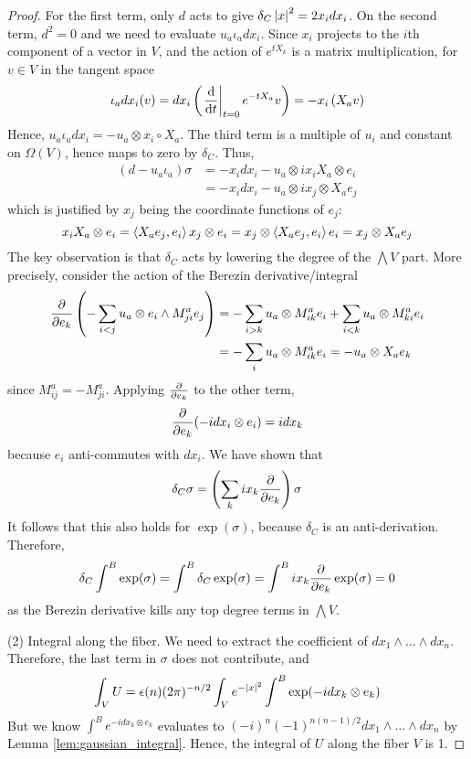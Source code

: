 \begin{proof}
For the first term, only $d$ acts to give $\delta_C \abs{x}^2 = 2x_i dx_i$.
On the second term, $d^2=0$ and we need to evaluate $u_a\iota_a dx_i$. 
Since $x_i$ projects to the $i$th component of a vector in $V$, and the action
of $e^{tX_k}$ is a matrix multiplication, for $v\in V$ in the tangent space
\begin{align} \label{eq:interior_dx}
	\iota_a dx_i(v)
	= d x_i \paren{\odv{}{t}_{t=0} e^{-tX_a} v} 
	= -x_i \paren{X_a v} 
\end{align}
Hence, $u_a\iota_a dx_i = -u_a\otimes x_i \circ X_a$. The third term is a
multiple of $u_i$ and constant on $\Omega(V)$,
hence maps to zero by  $\delta_C$. Thus, 
\begin{align}
	(d-u_a\iota_a) \sigma 
&= -x_i dx_i - u_a \otimes i x_iX_a \otimes e_i \nonumber \\
&= -x_i dx_i - u_a \otimes i x_j \otimes X_a e_j 
\end{align}
which is justified by $x_j$ being the coordinate functions of $e_j$:
\begin{equation} \label{eq:move_operator_tensor}
x_i X_a \otimes e_i 
= \gen{X_ae_j,e_i}x_j \otimes e_i 
= x_j \otimes \gen{X_ae_j,e_i}e_i 
= x_j \otimes X_a e_j 
\end{equation}
The key observation is that $\delta_C$ acts by lowering the degree of the
$\bigwedge V$ part. More precisely, consider the action of the Berezin
derivative/integral
\begin{align*}
\pdv{}{e_k} \paren{-\sum_{i<j} u_a\otimes e_i\wedge M^a_{ji}e_j}
&= -\sum_{i>k} u_a\otimes M^a_{ik}e_i + 
 \sum_{i<k} u_a\otimes M^a_{ki}e_i \\
&= -\sum_{i} u_a\otimes M^a_{ik}e_i  
= -u_a\otimes X_a e_k  
\end{align*}
since $M^a_{ij}=-M^a_{ji}$. Applying $\pdv{}{e_k}$ to the other term,
\[
\pdv{}{e_k} (-idx_i \otimes e_i) = idx_k
\] 
because $e_i$ anti-commutes with  $dx_i$. We have shown that
\begin{equation}
\delta_C \sigma = \paren{\sum_{k} ix_k \pdv{}{e_k}}\sigma
\end{equation}
It follows that this also holds for $\exp (\sigma)$, because  $\delta_C$ is an
anti-derivation. Therefore, 
\[
\delta_C \int^B \exp(\sigma) 
= \int^B \delta_C \exp(\sigma)
= \int^B ix_k \pdv{}{e_k} \exp(\sigma) = 0
\] 
as the Berezin derivative kills any top degree terms in $\bigwedge V$.

(2) Integral along the fiber. We need to extract the coefficient of $dx_1\wedge
\ldots\wedge dx_n$. Therefore, the last term in $\sigma$ does not contribute,
and 
 \[
	 \int_V U = \epsilon(n)(2\pi)^{-n /2}\int_V e^{-\abs{x}^2} \int^B \exp(-idx_k \otimes e_k) 
\] 
But we know $\int^Be^{-idx_k\otimes e_k}$ evaluates to 
$(-i)^n(-1)^{n(n-1)/2} dx_1\wedge \ldots\wedge dx_n$ by Lemma
\ref{lem:gaussian_integral}. Hence, the integral of $U$ along the fiber $V$ is 1.


\end{proof}
